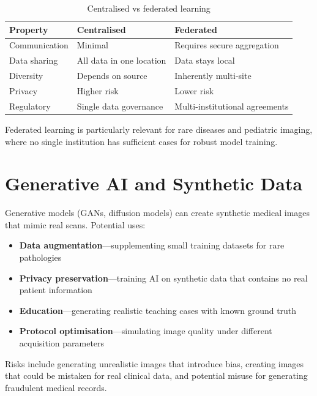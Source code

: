 \begin{table}[h]
\centering
\caption{Centralised vs federated learning}
\begin{tabular}{|l|l|l|}
\hline
\textbf{Property} & \textbf{Centralised} & \textbf{Federated} \\
\hline
Communication & Minimal & Requires secure aggregation \\
\hline
Data sharing & All data in one location & Data stays local \\
\hline
Diversity & Depends on source & Inherently multi-site \\
\hline
Privacy & Higher risk & Lower risk \\
\hline
Regulatory & Single data governance & Multi-institutional agreements \\
\hline
\end{tabular}
\end{table}

Federated learning is particularly relevant for rare diseases and pediatric imaging, where no single institution has sufficient cases for robust model training.

\section{Generative AI and Synthetic Data}
Generative models (GANs, diffusion models) can create synthetic medical images that mimic real scans. Potential uses:
\begin{itemize}
    \item \textbf{Data augmentation}---supplementing small training datasets for rare pathologies
    \item \textbf{Privacy preservation}---training AI on synthetic data that contains no real patient information
    \item \textbf{Education}---generating realistic teaching cases with known ground truth
    \item \textbf{Protocol optimisation}---simulating image quality under different acquisition parameters
\end{itemize}

Risks include generating unrealistic images that introduce bias, creating images that could be mistaken for real clinical data, and potential misuse for generating fraudulent medical records.

